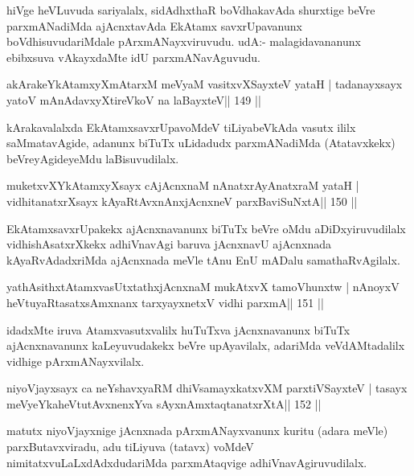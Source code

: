 \begin{artha}
hiVge heVLuvuda sariyalalx, sidAdhxthaR boVdhakavAda shurxtige beVre parxmANadiMda ajAcnxtavAda EkAtamx savxrUpavanunx boVdhisuvudariMdale pArxmANayxviruvudu. udA:- malagidavananunx ebibxsuva vAkayxdaMte idU parxmANavAguvudu.
\end{artha}

\begin{shl}
akArakeYkAtamxyXmAtarxM meVyaM vasitxvXSayxteV yataH |
tadanayxsayx yatoV mAnAdavxyXtireVkoV na laBayxteV\hfill || 149 ||
\end{shl}

\begin{artha}
kArakavalalxda EkAtamxsavxrUpavoMdeV tiLiyabeVkAda vasutx ililx saMmatavAgide, adanunx biTuTx uLidadudx parxmANadiMda (Atatavxkekx) beVreyAgideyeMdu laBisuvudilalx.
\end{artha}

\begin{shl}
muketxvXYkAtamxyXsayx cAjAcnxnaM nAnatxrAyAnatxraM yataH |
vidhitanatxrXsayx kAyaRtAvxnAnxjAcnxneV parxBaviSuNxtA\hfill || 150 ||
\end{shl}

\begin{artha}
EkAtamxsavxrUpakekx ajAcnxnavanunx biTuTx beVre oMdu aDiDxyiruvudilalx vidhishAsatxrXkekx adhiVnavAgi baruva jAcnxnavU ajAcnxnada kAyaRvAdadxriMda ajAcnxnada meVle tAnu EnU mADalu samathaRvAgilalx.
\end{artha}

\begin{shl}
yathAsithxtAtamxvasUtxtathxjAcnxnaM mukAtxvX tamoVhunxtw |
nAnoyxV heVtuyaRtasatxsAmxnanx tarxyayxnetxV vidhi parxmA\hfill || 151 ||
\end{shl}

\begin{artha}
idadxMte iruva Atamxvasutxvalilx huTuTxva jAcnxnavanunx biTuTx ajAcnxnavanunx kaLeyuvudakekx beVre upAyavilalx, adariMda veVdAMtadalilx vidhige pArxmANayxvilalx.
\end{artha}

\begin{shl}
niyoVjayxsayx ca neYshavxyaRM dhiVsamayxkatxvXM parxtiVSayxteV |
tasayx meVyeYkaheVtutAvxnenxYva sAyxnAmxtaqtanatxrXtA\hfill || 152 ||
\end{shl}

\begin{artha}
matutx niyoVjayxnige jAcnxnada pArxmANayxvanunx kuritu (adara meVle) parxButavxviradu, adu tiLiyuva (tatavx) voMdeV nimitatxvuLaLxdAdxdudariMda parxmAtaqvige adhiVnavAgiruvudilalx.
\end{artha}

